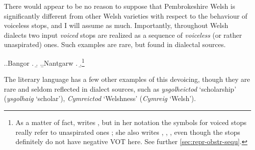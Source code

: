 There would appear to be no reason to suppose that Pembrokeshire Welsh is significantly different from other Welsh varieties with respect to the behaviour of voiceless stops, and I will assume as much. Importantly, throughout Welsh dialects two input \emph{voiced} stops are realized as a sequence of \emph{voiceless} (or rather unaspirated) ones. Such examples are rare, but found in dialectal sources.

\ex.\a.Bangor \citep{fynes-clinton}
\a.
\b.
\z.\b.Nantgarw \citep{thomas93:_tafod_nantg}
\a.
\b.\footnote{\label{fn:thomas-notation}As a matter of fact, \citet{thomas93:_tafod_nantg} writes \ipa{[ˈɡwakder]}, but in her notation the symbols for voiced stops really refer to unaspirated ones \citep[p.~101]{thomas93:_tafod_nantg}; she also writes \ipa{[sb]}, \ipa{[sd]}, \ipa{[sɡ]}, even though the stops definitely do not have negative VOT here. See further \cref{sec:repr-obstr-sequ}.}

The literary language has a few other examples of this devoicing, though they are rare and seldom reflected in dialect sources, such as \emph{ysgolheictod} `scholarship' (\cf \emph{ysgolhaig} `scholar'), \emph{Cymreictod} `Welshness' (\cf \emph{Cymreig} `Welsh').

